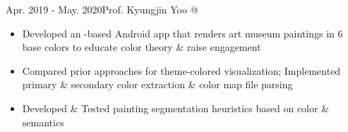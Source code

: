 {        {Apr. 2019 - May. 2020}{Prof. Kyungjin Yoo @ }%
    \begin{itemize}%
        \item Developed an -based Android app
        that renders art museum paintings in 6 base colors to educate color theory \& raise engagement%
        \item Compared prior approaches for theme-colored visualization; Implemented primary \& secondary color extraction \& color map file parsing%
        \item Developed \& Tested painting segmentation heuristics based on color \& semantics%
    \end{itemize}%
    \dividerSmall
}%
%
%